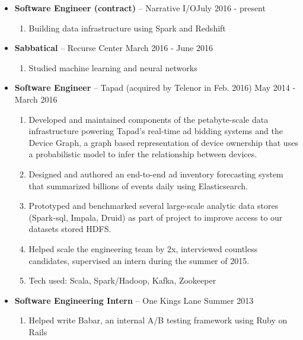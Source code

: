 \documentclass[11pt]{article}
\begin{document}
\begin{itemize}[leftmargin=12pt]
  \item[] \textbf{Software Engineer (contract)} -- Narrative I/O\hfill July 2016 - present
    \begin{enumerate}[leftmargin=2em,labelindent=16pt,label=$\bullet$]
      \item Building data infrastructure using Spark and Redshift
    \end{enumerate}
  \item[] \textbf{Sabbatical} -- Recurse Center \hfill March 2016 - June 2016
    \begin{enumerate}[leftmargin=2em,labelindent=16pt,label=$\bullet$]
      \item Studied machine learning and neural networks
    \end{enumerate}
  \item[] \textbf{Software Engineer} -- Tapad (acquired by Telenor in Feb. 2016) \hfill May 2014 - March 2016 
    \begin{enumerate}[leftmargin=2em,labelindent=16pt,label=$\bullet$]
      \item Developed and maintained components of the petabyte-scale data infrastructure powering Tapad's real-time ad bidding systems and the Device Graph, a graph based representation of device ownership that uses a probabilistic model to infer the relationship between devices. 
      \item Designed and authored an end-to-end ad inventory forecasting system that summarized billions of events daily using Elasticsearch.
      \item Prototyped and benchmarked several large-scale analytic data stores (Spark-sql, Impala, Druid) as part of project to improve access to our datasets stored HDFS. 
      \item Helped scale the engineering team by 2x, interviewed countless candidates, supervised an intern during the summer of 2015.
      \item Tech used: Scala, Spark/Hadoop, Kafka, Zookeeper
    \end{enumerate}
  \item[] \textbf{Software Engineering Intern} -- One Kings Lane \hfill Summer 2013 
    \begin{enumerate}[leftmargin=2em,labelindent=16pt,label=$\bullet$]
      \item Helped write Babar, an internal A/B testing framework using Ruby on Rails
    \end{enumerate}


\end{itemize}
\end{document}
